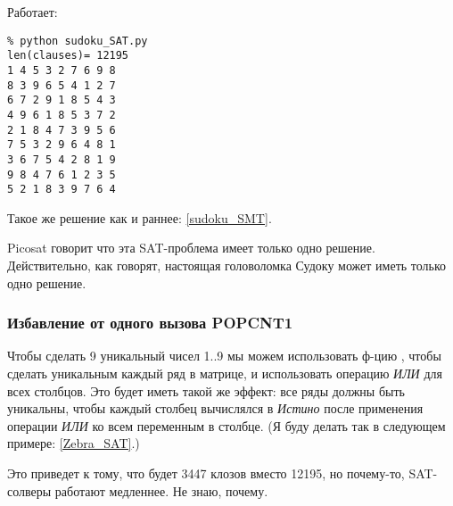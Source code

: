 Работает:

\begin{lstlisting}
% python sudoku_SAT.py
len(clauses)= 12195
1 4 5 3 2 7 6 9 8
8 3 9 6 5 4 1 2 7
6 7 2 9 1 8 5 4 3
4 9 6 1 8 5 3 7 2
2 1 8 4 7 3 9 5 6
7 5 3 2 9 6 4 8 1
3 6 7 5 4 2 8 1 9
9 8 4 7 6 1 2 3 5
5 2 1 8 3 9 7 6 4
\end{lstlisting}

Такое же решение как и раннее: \ref{sudoku_SMT}.

Picosat говорит что эта SAT-проблема имеет только одно решение.
Действительно, как говорят, настоящая головоломка Судоку может иметь только одно решение.

\subsubsection{Избавление от одного вызова POPCNT1}
\label{OR_in_POPCNT1}

Чтобы сделать 9 уникальный чисел 1..9 мы можем использовать ф-цию , чтобы сделать уникальным каждый ряд
в матрице, и использовать операцию \textit{ИЛИ} для всех столбцов.
Это будет иметь такой же эффект: все ряды должны быть уникальны, чтобы каждый столбец вычислялся в \textit{Истино}
после применения операции \textit{ИЛИ} ко всем переменным в столбце.
(Я буду делать так в следующем примере: \ref{Zebra_SAT}.)

Это приведет к тому, что будет 3447 клозов вместо 12195, но почему-то, SAT-солверы работают медленнее. Не знаю, почему.

